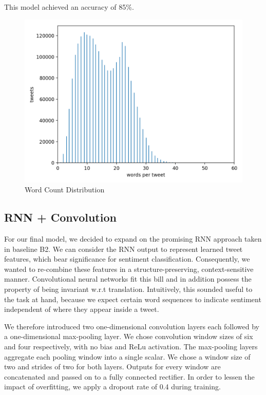 \documentclass[10pt,conference,compsocconf]{IEEEtran}
\begin{document}
This model achieved an accuracy of 85\%.

\begin{figure}[h!]
  \centering
  \includegraphics[scale=0.53]{word_count_histogram.png}
  \caption{Word Count Distribution}
  \label{fig:wordcount}
\end{figure}


\subsection{RNN + Convolution} \label{our-model}

For our final model, we decided to expand on the promising RNN
approach taken in baseline B2. We can consider the RNN output to
represent learned tweet features, which bear significance for
sentiment classification. Consequently, we wanted to re-combine these
features in a structure-preserving, context-sensitive
manner. Convolutional neural networks fit this bill and in addition
possess the property of being invariant w.r.t
translation. Intuitively, this sounded useful to the task at hand,
because we expect certain word sequences to indicate sentiment
independent of where they appear inside a tweet.

We therefore introduced two one-dimensional convolution layers each
followed by a one-dimensional max-pooling layer. We chose convolution
window sizes of six and four respectively, with no bias and ReLu
activation. The max-pooling layers aggregate each pooling window into
a single scalar. We chose a window size of two and strides of two for
both layers. Outputs for every window are concatenated and passed on
to a fully connected rectifier. In order to lessen the impact of
overfitting, we apply a dropout rate of 0.4 during training.
\end{document}
